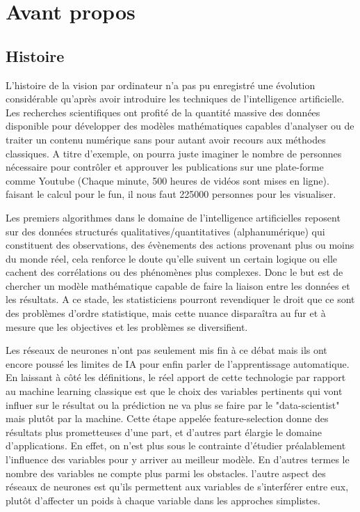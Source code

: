 \chapter*{Avant propos}
\thispagestyle{empty}
\section*{Histoire}
\setlength{\parindent}{20px}
L'histoire de la vision par ordinateur n'a pas pu enregistré une évolution considérable qu'après avoir introduire les techniques de l'intelligence artificielle.
Les recherches scientifiques ont profité de la quantité massive des données disponible pour développer des modèles mathématiques capables d'analyser ou de traiter un contenu numérique sans pour autant avoir recours aux méthodes classiques.
A titre d'exemple, on pourra juste imaginer le nombre de personnes nécessaire pour contrôler et approuver les publications sur une plate-forme comme Youtube (Chaque minute, 500 heures de vidéos sont mises en ligne). faisant le calcul pour le fun, 
il nous faut 225000 personnes pour les visualiser.

Les premiers algorithmes dans le domaine de l'intelligence artificielles reposent sur des données structurés qualitatives/quantitatives (alphanumérique) qui constituent des observations, des évènements des actions provenant plus ou moins du monde réel, cela renforce le doute qu'elle suivent un certain logique ou elle cachent des corrélations ou des phénomènes plus complexes. Donc le but est de chercher un modèle mathématique capable de faire la liaison entre les données et les résultats.
A ce stade, les statisticiens pourront revendiquer le droit que ce sont des problèmes d'ordre statistique, mais cette nuance disparaîtra au fur et à mesure que les objectives et les problèmes se diversifient.

Les réseaux de neurones n'ont pas seulement mis fin à ce débat mais ils ont encore poussé les limites de IA pour enfin parler de l'apprentissage automatique.
En laissant à côté les définitions, le réel apport de cette technologie par rapport au machine learning classique est que le choix des variables pertinents qui vont influer sur le résultat ou la prédiction ne va plus se faire par le "data-scientist" mais plutôt par la machine. Cette étape appelée feature-selection donne des résultats plus prometteuses d'une part, et d'autres part élargie le domaine d'applications. En effet, on n'est plus sous le contrainte d'étudier préalablement l'influence des variables pour y arriver au meilleur modèle. En d'autres termes le nombre des variables ne compte plus parmi les obstacles. l'autre aspect des réseaux de neurones est qu'ils permettent aux variables de s'interférer entre eux, plutôt d'affecter un poids à chaque variable dans les approches simplistes.

